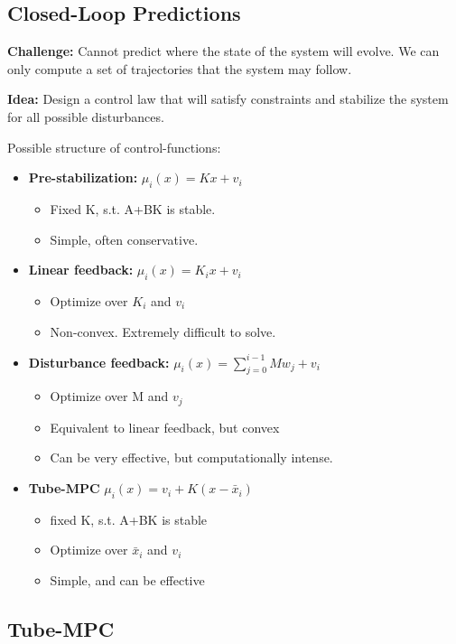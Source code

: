 \documentclass[8pt,a4paper]{scrartcl}
\begin{document}
\begin{multicols*}{3}
\subsection{Closed-Loop Predictions}

\textbf{Challenge: }Cannot predict where the state of the system will evolve. We can only compute a set of trajectories that the system may follow.

\finn

\textbf{Idea: }Design a control law that will satisfy constraints and stabilize the system for all possible disturbances.

Possible structure of control-functions:

\begin{itemize}
\ncompaq
\item \textbf{Pre-stabilization:} $\mu_i(x)=Kx+v_i$
\begin{itemize}
\ncompaq
\item Fixed K, s.t. A+BK is stable.
\item Simple, often conservative.
\end{itemize}
\item \textbf{Linear feedback:} $\mu_i(x)=K_ix+v_i$
\begin{itemize}
\ncompaq
\item Optimize over $K_i$ and $v_i$
\item Non-convex. Extremely difficult to solve.
\end{itemize}
\item \textbf{Disturbance feedback:} $\mu_i(x)=\sum\limits_{j=0}^{i-1} Mw_j+v_i$
\begin{itemize}
\ncompaq
\item Optimize over M and $v_j$
\item Equivalent to linear feedback, but convex
\item Can be very effective, but computationally intense.
\end{itemize}
\item \textbf{Tube-MPC} $\mu_i(x)=v_i+K(x-\bar{x}_i)$
\begin{itemize}
\ncompaq
\item fixed K, s.t. A+BK is stable
\item Optimize over $\bar{x}_i$ and $v_i$
\item Simple, and can be effective
\end{itemize}
\end{itemize}

\subsection{Tube-MPC}


\end{multicols*}
\end{document}
